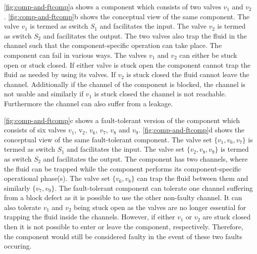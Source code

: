 \autoref{fig:comp-and-ftcomp}a shows a component which consists of two valves $v_1$ and $v_2$. \autoref{fig:comp-and-ftcomp}b shows the conceptual view of the same component. The valve $v_1$ is termed as switch $S_1$ and facilitates the input. The valve $v_2$ is termed as switch $S_2$ and facilitates the output. The two valves also trap the fluid in the channel such that the component-specific operation can take place. The component can fail in various ways. The valves $v_1$ and $v_2$ can either be stuck open or stuck closed. If either valve is stuck open the component cannot trap the fluid as needed by using its valves. If $v_2$ is stuck closed the fluid cannot leave the channel. Additionally if the channel of the component is blocked, the channel is not usable and similarly if $v_1$ is stuck closed the channel is not reachable. Furthermore the channel can also suffer from a leakage.

\autoref{fig:comp-and-ftcomp}c shows a fault-tolerant version of the component which consists of six valves $v_1$, v$_2$, $v_6$, $v_7$, $v_8$ and $v_9$. \autoref{fig:comp-and-ftcomp}d shows the conceptual view of the same fault-tolerant component. The valve set $\{v_1, v_6, v_7\}$ is termed as switch $S_1$ and facilitates the input. The valve set $\{v_2, v_8, v_9\}$ is termed as switch $S_2$ and facilitates the output. The component has two channels, where the fluid can be trapped while the component performs its component-specific operational phase(s). The valve set $\{v_6, v_8\}$ can trap the fluid between them and similarly $\{v_7, v_9\}$. The fault-tolerant component can tolerate one channel suffering from a block defect as it is possible to use the other non-faulty channel. It can also tolerate $v_1$ and $v_2$ being stuck open as the valves are no longer essential for trapping the fluid inside the channels. However, if either $v_1$ or $v_2$ are stuck closed then it is not possible to enter or leave the component, respectively. Therefore, the component would still be considered faulty in the event of these two faults occuring.

